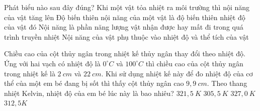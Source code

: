 
\begin{ex}
	Phát biểu nào sau đây đúng?
	\choice 
	{Khi một vật tỏa nhiệt ra môi trường thì nội năng của vật tăng lên}
	{Độ biến thiên nội năng của một vật là độ biến thiên nhiệt độ của vật đó}
	{Nội năng là phần năng lượng vật nhận được hay mất đi trong quá trình truyền nhiệt}
	{\True Nội năng của vật phụ thuộc vào nhiệt độ và thể tích của vật}
\end{ex}

\begin{ex}
	Chiều cao của cột thủy ngân trong nhiệt kế thủy ngân thay đổi theo nhiệt độ. Ứng với hai vạch có nhiệt độ là $0^\circ C$ và $100^\circ C$ thì chiều cao của cột thủy ngân trong nhiệt kế là $2\ cm$ và $22\ cm$. Khi sử dụng nhiệt kế này để đo nhiệt độ của cơ thể của một em bé đang bị sốt thì thấy cột thủy ngân cao $9,9 \ cm$. Theo thang nhiệt Kelvin, nhiệt độ của em bé lúc này là bao nhiêu?
	\choice 
	{$321,5\ K$}
	{$305,5\ K$}
	{$327,0\ K$}
	{\True $312,5 K$}
\end{ex}


